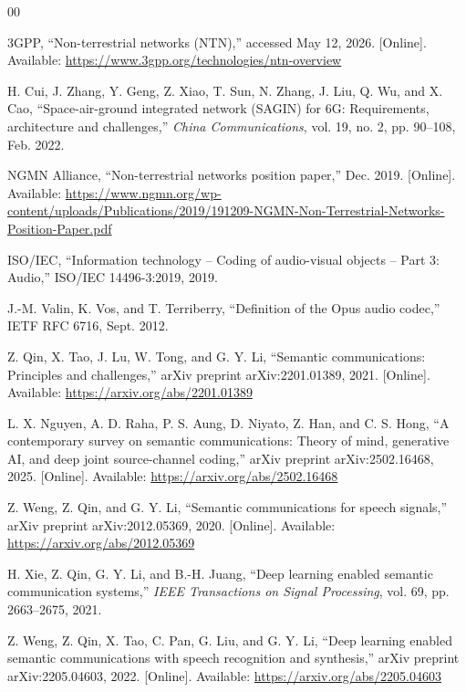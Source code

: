 \documentclass[lettersize,journal]{IEEEtran}
\begin{document}
\begin{thebibliography}{00}
\setlength{\itemsep}{0pt}
\setlength{\parsep}{0pt}

 3GPP, ``Non-terrestrial networks (NTN),'' accessed May 12, 2026. [Online]. Available: \url{https://www.3gpp.org/technologies/ntn-overview}

 H. Cui, J. Zhang, Y. Geng, Z. Xiao, T. Sun, N. Zhang, J. Liu, Q. Wu, and X. Cao, ``Space-air-ground integrated network (SAGIN) for 6G: Requirements, architecture and challenges,'' \emph{China Communications}, vol. 19, no. 2, pp. 90--108, Feb. 2022.

 NGMN Alliance, ``Non-terrestrial networks position paper,'' Dec. 2019. [Online]. Available: \url{https://www.ngmn.org/wp-content/uploads/Publications/2019/191209-NGMN-Non-Terrestrial-Networks-Position-Paper.pdf}

 ISO/IEC, ``Information technology -- Coding of audio-visual objects -- Part 3: Audio,'' ISO/IEC 14496-3:2019, 2019.

 J.-M. Valin, K. Vos, and T. Terriberry, ``Definition of the Opus audio codec,'' IETF RFC 6716, Sept. 2012.

 Z. Qin, X. Tao, J. Lu, W. Tong, and G. Y. Li, ``Semantic communications: Principles and challenges,'' arXiv preprint arXiv:2201.01389, 2021. [Online]. Available: \url{https://arxiv.org/abs/2201.01389}

 L. X. Nguyen, A. D. Raha, P. S. Aung, D. Niyato, Z. Han, and C. S. Hong, ``A contemporary survey on semantic communications: Theory of mind, generative AI, and deep joint source-channel coding,'' arXiv preprint arXiv:2502.16468, 2025. [Online]. Available: \url{https://arxiv.org/abs/2502.16468}

 Z. Weng, Z. Qin, and G. Y. Li, ``Semantic communications for speech signals,'' arXiv preprint arXiv:2012.05369, 2020. [Online]. Available: \url{https://arxiv.org/abs/2012.05369}

 H. Xie, Z. Qin, G. Y. Li, and B.-H. Juang, ``Deep learning enabled semantic communication systems,'' \emph{IEEE Transactions on Signal Processing}, vol. 69, pp. 2663--2675, 2021.

 Z. Weng, Z. Qin, X. Tao, C. Pan, G. Liu, and G. Y. Li, ``Deep learning enabled semantic communications with speech recognition and synthesis,'' arXiv preprint arXiv:2205.04603, 2022. [Online]. Available: \url{https://arxiv.org/abs/2205.04603}


\end{thebibliography}
\end{document}
